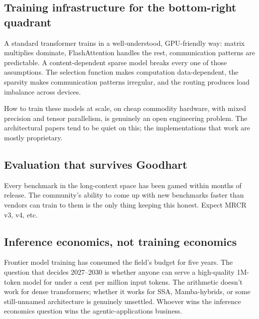 \subsection{Training infrastructure for the bottom-right quadrant}

A standard transformer trains in a well-understood, GPU-friendly way:
matrix multiplies dominate, FlashAttention handles the rest, communication
patterns are predictable. A content-dependent sparse model breaks every
one of those assumptions. The selection function makes computation
data-dependent, the sparsity makes communication patterns irregular, and
the routing produces load imbalance across devices.

How to train these models at scale, on cheap commodity hardware, with
mixed precision and tensor parallelism, is genuinely an open engineering
problem. The architectural papers tend to be quiet on this; the
implementations that work are mostly proprietary.

\subsection{Evaluation that survives Goodhart}

Every benchmark in the long-context space has been gamed within months
of release. The community's
ability to come up with new benchmarks faster than vendors can train to
them is the only thing keeping this honest. Expect MRCR v3, v4, etc.

\subsection{Inference economics, not training economics}

Frontier model training has consumed the field's budget for five years.
The question that decides 2027--2030 is whether anyone can serve a
high-quality 1M-token model for under a cent per million input tokens.
The arithmetic doesn't work for dense transformers; whether it works for
SSA, Mamba-hybrids, or some still-unnamed architecture is genuinely
unsettled. Whoever wins the inference economics question wins the
agentic-applications business.

